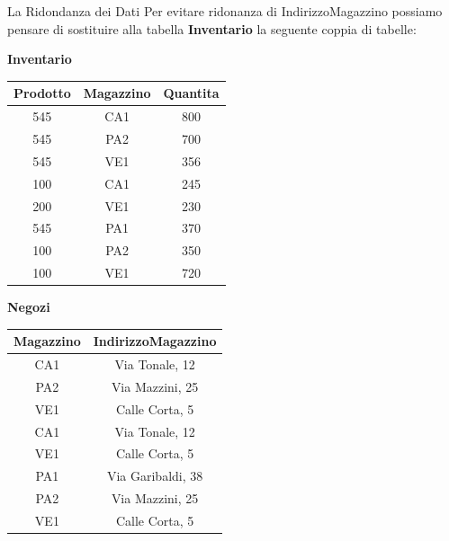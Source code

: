 \begin{frame}{La Ridondanza dei Dati}
Per evitare ridonanza di IndirizzoMagazzino possiamo pensare di sostituire alla tabella \textbf{Inventario} la seguente coppia di tabelle:
\pause
\vspace{.2cm}

    \begin{minipage}[t]{0.48\linewidth}
            \begin{center}
                \textbf{Inventario}
                
                \begin{tabular}{|c|c|c|}
                    \hline
                    \rowcolor{cyan!30}Prodotto & Magazzino & Quantita \\
                    \hline
                    545 & CA1 & 800 \\ \hline
                    545 & PA2 & 700 \\ \hline
                    545 & VE1 & 356 \\ \hline
                    100 & CA1 & 245 \\ \hline
                    200 & VE1 & 230 \\ \hline
                    545 & PA1 & 370 \\ \hline
                    100 & PA2 & 350 \\ \hline
                    100 & VE1 & 720 \\ \hline
                \end{tabular}
            \end{center}
        \end{minipage}%
        \hfill%
        \begin{minipage}[t]{0.48\linewidth}
            \begin{center}
                \textbf{Negozi}
        
                \begin{tabular}{|c|c|}
                    \hline
                    \rowcolor{cyan!30}Magazzino & IndirizzoMagazzino \\
                    \hline
                    CA1 & Via Tonale, 12 \\ \hline
                    PA2 & Via Mazzini, 25 \\ \hline
                    VE1 & Calle Corta, 5 \\ \hline
                    CA1 & Via Tonale, 12 \\ \hline
                    VE1 & Calle Corta, 5 \\ \hline
                    PA1 & Via Garibaldi, 38 \\ \hline
                    PA2 & Via Mazzini, 25 \\ \hline
                    VE1 & Calle Corta, 5 \\ \hline
                \end{tabular}
            \end{center}
        \end{minipage}
\end{frame}
